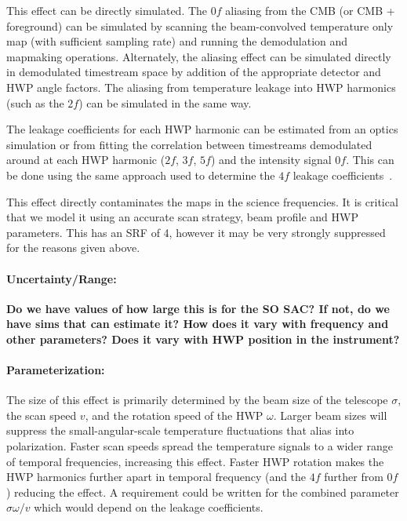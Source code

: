 This effect can be directly simulated. The $0f$ aliasing from the CMB (or CMB + foreground) can be simulated by scanning the beam-convolved temperature only map (with sufficient sampling rate) and running the demodulation and mapmaking operations. Alternately, the aliasing effect can be simulated directly in demodulated timestream space by addition of the appropriate detector and HWP angle factors. The aliasing from temperature leakage into HWP harmonics (such as the $2f$) can be simulated in the same way.


The leakage coefficients for each HWP harmonic can be estimated from an optics simulation or from fitting the correlation between timestreams demodulated around at each HWP harmonic ($2f$, $3f$, $5f$) and the intensity signal $0f$.
This can be done using the same approach used to determine the $4f$ leakage coefficients~\cite{Essinger-Hileman2016,Didier_Thesis,PB1_WHWP}.


This effect directly contaminates the maps in the science frequencies. It is critical that we model it using an accurate scan strategy, beam profile and HWP parameters. This has an SRF of 4, however it may be very strongly suppressed for the reasons given above.

\paragraph{Uncertainty/Range:}
\textbf{Do we have values of how large this is for the SO SAC? If not, do we have sims that can estimate it? How does it vary with frequency and other parameters? Does it vary with HWP position in the instrument?}

\paragraph{Parameterization:}
The size of this effect is primarily determined by the beam size of the telescope $\sigma$, the scan speed $v$, and the rotation speed of the HWP $\omega$. Larger beam sizes will suppress the small-angular-scale temperature fluctuations that alias into polarization. Faster scan speeds spread the temperature signals to a wider range of temporal frequencies, increasing this effect. Faster HWP rotation makes the HWP harmonics further apart in temporal frequency (and the $4f$ further from $0f$) reducing the effect. A requirement could be written for the combined parameter $\sigma\omega/v$ which would depend on the leakage coefficients.
